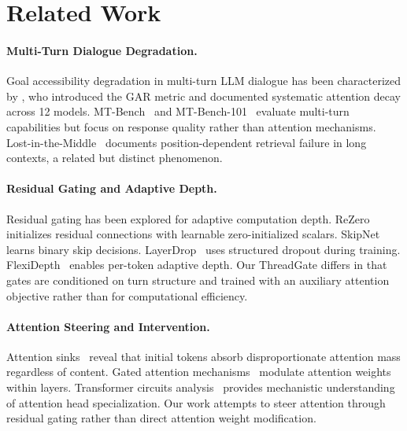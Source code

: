 \documentclass[11pt,a4paper]{article}
\begin{document}
\section{Related Work}

\paragraph{Multi-Turn Dialogue Degradation.}
Goal accessibility degradation in multi-turn LLM dialogue has been characterized by \citet{dongre2026gar}, who introduced the GAR metric and documented systematic attention decay across 12 models. MT-Bench~\cite{zheng2023judging} and MT-Bench-101~\cite{bai2024mtbench101} evaluate multi-turn capabilities but focus on response quality rather than attention mechanisms. Lost-in-the-Middle~\cite{liu2024lost} documents position-dependent retrieval failure in long contexts, a related but distinct phenomenon.

\paragraph{Residual Gating and Adaptive Depth.}
Residual gating has been explored for adaptive computation depth. ReZero~\cite{bachlechner2021rezero} initializes residual connections with learnable zero-initialized scalars. SkipNet~\cite{wang2018skipnet} learns binary skip decisions. LayerDrop~\cite{fan2020reducing} uses structured dropout during training. FlexiDepth~\cite{luo2025flexidepth} enables per-token adaptive depth. Our ThreadGate differs in that gates are conditioned on turn structure and trained with an auxiliary attention objective rather than for computational efficiency.

\paragraph{Attention Steering and Intervention.}
Attention sinks~\cite{xiao2024efficient} reveal that initial tokens absorb disproportionate attention mass regardless of content. Gated attention mechanisms~\cite{qiu2025gated} modulate attention weights within layers. Transformer circuits analysis~\cite{elhage2021mathematical} provides mechanistic understanding of attention head specialization. Our work attempts to steer attention through residual gating rather than direct attention weight modification.
\end{document}
